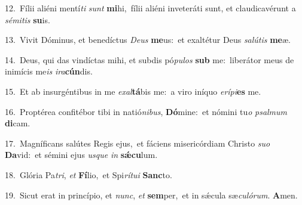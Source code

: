 {\numbfont\textcolor{\numbcolor}{12.}}~Fílii aliéni mentí\textit{ti} \textit{sunt} \textbf{mi}\-hi,~\star fílii aliéni inveteráti sunt, et claudicavérunt a \textit{sé}\-\textit{mi}\textit{tis} \textbf{su}\-is.\par
{\numbfont\textcolor{\numbcolor}{13.}}~Vivit Dóminus, et benedíctus \textit{De}\-\textit{us} \textbf{me}\-us:~\star et exaltétur Deus \textit{sa}\-\textit{lú}\textit{tis} \textbf{me}\-æ.\par
{\numbfont\textcolor{\numbcolor}{14.}}~Deus, qui das vindíctas mihi, et subdis pó\-\textit{pu}\-\textit{los} \textbf{sub} me:~\star liberátor meus de inimícis me\textit{is} \textit{i}\-\textit{ra}\textbf{cún}dis.\par
{\numbfont\textcolor{\numbcolor}{15.}}~Et ab insurgéntibus in me \textit{ex}\-\textit{al}\textbf{tá}bis me:~\star a viro iníquo \textit{e}\-\textit{rí}\textit{pi}\textbf{es} me.\par
{\numbfont\textcolor{\numbcolor}{16.}}~Proptérea confitébor tibi in natió\-\textit{ni}\-\textit{bus}, \textbf{Dó}\-mine:~\star et nómini tu\textit{o} \textit{psal}\-\textit{mum} \textbf{di}\-cam.\par
{\numbfont\textcolor{\numbcolor}{17.}}~Magníficans salútes Regis ejus,~\dagger et fáciens misericórdiam Christo \textit{su}\-\textit{o} \textbf{Da}\-vid:~\star et sémini ejus \textit{us}\-\textit{que} \textit{in} \textbf{sǽ}\-\textbf{cu}lum.\par
{\numbfont\textcolor{\numbcolor}{18.}}~Glória Pa\-\textit{tri}\-, \textit{et} \textbf{Fí}\-lio,~\star et Spi\-\textit{rí}\-\textit{tu}\textit{i} \textbf{Sanc}\-to.\par
{\numbfont\textcolor{\numbcolor}{19.}}~Sicut erat in princípio, et \textit{nunc}\-, \textit{et} \textbf{sem}\-per,~\star et in sǽcula sæ\-\textit{cu}\-\textit{ló}\textit{rum}. \textbf{A}\-men.\par
